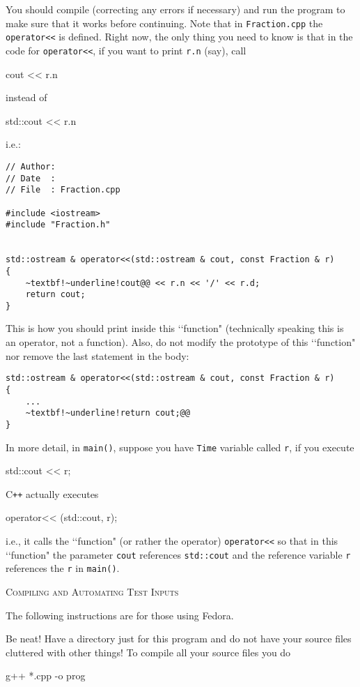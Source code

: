 You should compile (correcting any errors if necessary)
and run the program 
to make sure that it works before
continuing. Note that in \verb!Fraction.cpp! the \verb!operator<<! is defined.
Right now, the only thing you need to know is that in the code for
\verb!operator<<!, if you want to print \verb!r.n! (say), call
\begin{console}
cout << r.n
\end{console}
instead of
\begin{console}
std::cout << r.n
\end{console}
i.e.:
\begin{Verbatim}[frame=single, commandchars=~!@]
// Author: 
// Date  : 
// File  : Fraction.cpp

#include <iostream>
#include "Fraction.h"


std::ostream & operator<<(std::ostream & cout, const Fraction & r)
{
    ~textbf!~underline!cout@@ << r.n << '/' << r.d;
    return cout;
}
\end{Verbatim}

This is how you should print inside this \lq\lq function" (technically speaking
this is an operator, not a function). Also, do not modify the prototype of this
\lq\lq function" nor remove the last statement in the body:
\begin{Verbatim}[frame=single, commandchars=~!@]
std::ostream & operator<<(std::ostream & cout, const Fraction & r)
{
    ...
    ~textbf!~underline!return cout;@@
}
\end{Verbatim}

In more detail, in \verb!main()!, suppose you have \verb!Time! variable called
\verb!r!, if you execute
\begin{console}
std::cout << r;
\end{console}
C\texttt{++} actually executes
\begin{console}
operator<< (std::cout, r);
\end{console}
i.e., it calls the \lq\lq function" (or rather the operator) \verb!operator<<!
so that in this \lq\lq function" the parameter \verb!cout! references
\verb!std::cout! and the reference variable \verb!r! references the \verb!r! in
\verb!main()!.

\newpage
\textsc{Compiling and Automating Test Inputs}

The following instructions are for those using Fedora.

Be neat! Have a directory just for this program and do not have your source
files cluttered with other things! To compile all your source files you do
\begin{console}
g++ *.cpp -o prog
\end{console}

